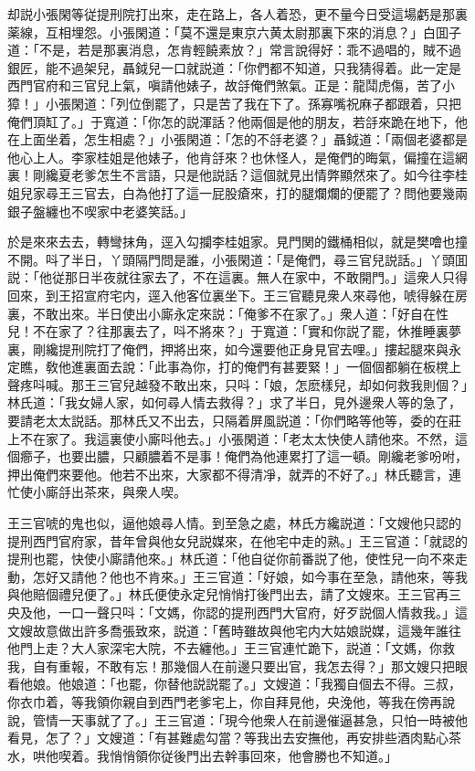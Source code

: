 却説小張閑等従提刑院打出來，走在路上，各人着恐，更不量今日受這場虧是那裏薬線，互相埋怨。小張閑道：「莫不還是東京六黄太尉那裏下來的消息？」白囬子道：「不是，若是那裏消息，怎肯輕饒素放？」常言說得好：乖不過唱的，賊不過銀匠，能不過架兒，聶鉞兒一口就説道：「你們都不知道，只我猜得着。此一定是西門官府和三官兒上氣，嗔請他婊子，故㧱俺們煞氣。正是：龍鬦虎傷，苦了小獐！」小張閑道：「列位倒罷了，只是苦了我在下了。孫寡嘴祝麻子都跟着，只把俺們頂缸了。」于寬道：「你怎的説渾話？他兩個是他的朋友，若㧱來跪在地下，他在上面坐着，怎生相處？」小張閑道：「怎的不㧱老婆？」聶鉞道：「兩個老婆都是他心上人。李家桂姐是他婊子，他肯㧱來？也休怪人，是俺們的晦氣，偏撞在這網裏！剛纔夏老爹怎生不言語，只是他説話？這個就見出情弊顯然來了。如今往李桂姐兒家尋王三官去，白為他打了這一屁股瘡來，打的腿爛爛的便罷了？問他要幾兩銀子盤纏也不喫家中老婆笑話。」

於是來來去去，轉彎抹角，逕入勾攔李桂姐家。見門関的鐵桶相似，就是樊噲也撞不開。呌了半日，丫頭隔門問是誰，小張閑道：「是俺們，尋三官兒説話。」丫頭囬説：「他従那日半夜就往家去了，不在這裏。無人在家中，不敢開門。」這衆人只得回來，到王招宣府宅内，逕入他客位裏坐下。王三官聽見衆人來尋他，唬得躲在房裏，不敢出來。半日使出小廝永定來説：「俺爹不在家了。」衆人道：「好自在性兒！不在家了？往那裏去了，呌不將來？」于寬道：「實和你説了罷，休推睡裏夢裏，剛纔提刑院打了俺們，押將出來，如今還要他正身見官去哩。」摟起腿來與永定瞧，敎他進裏面去說：「此事為你，打的俺們有甚要緊！」一個個都躺在板櫈上聲疼呌喊。那王三官兒越發不敢出來，只呌：「娘，怎麽樣兒，却如何救我則個？」林氏道：「我女婦人家，如何尋人情去救得？」求了半日，見外邊衆人等的急了，要請老太太説話。那林氏又不出去，只隔着屏風説道：「你們略等他等，委的在莊上不在家了。我這裏使小廝呌他去。」小張閑道：「老太太快使人請他來。不然，這個癤子，也要出膿，只顧膿着不是事！俺們為他連累打了這一頓。剛纔老爹吩咐，押出俺們來要他。他若不出來，大家都不得清凈，就弄的不好了。」林氏聽言，連忙使小廝㧱出茶來，與衆人喫。

王三官唬的鬼也似，逼他娘尋人情。到至急之處，林氏方纔説道：「文嫂他只認的提刑西門官府家，昔年曾與他女兒説媒來，在他宅中走的熟。」王三官道：「就認的提刑也罷，快使小廝請他來。」林氏道：「他自従你前番説了他，使性兒一向不來走動，怎好又請他？他也不肯來。」王三官道：「好娘，如今事在至急，請他來，等我與他賠個禮兒便了。」林氏便使永定兒悄悄打後門出去，請了文嫂來。王三官再三央及他，一口一聲只呌：「文媽，你認的提刑西門大官府，好歹説個人情救我。」這文嫂故意做出許多喬張致來，説道：「舊時雖故與他宅内大姑娘説媒，這幾年誰往他門上走？大人家深宅大院，不去纏他。」王三官連忙跪下，説道：「文媽，你救我，自有重報，不敢有忘！那幾個人在前邊只要出官，我怎去得？」那文嫂只把眼看他娘。他娘道：「也罷，你替他説説罷了。」文嫂道：「我獨自個去不得。三叔，你衣巾着，等我領你親自到西門老爹宅上，你自拜見他，央浼他，等我在傍再說說，管情一天事就了了。」王三官道：「現今他衆人在前邊催逼甚急，只怕一時被他看見，怎了？」文嫂道：「有甚難處勾當？等我出去安撫他，再安排些酒肉點心茶水，哄他喫着。我悄悄領你従後門出去幹事回來，他會勝也不知道。」

